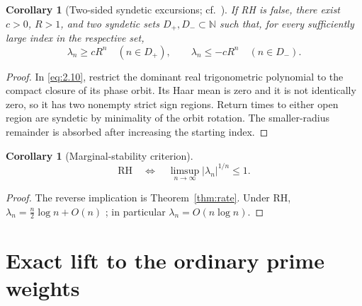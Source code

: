 \documentclass[11pt]{amsart}
\numberwithin{equation}{section}
\newtheorem{corollary}[theorem]{Corollary}
\theoremstyle{definition}
\theoremstyle{remark}
\newcommand{\RH}{\mathrm{RH}}
\begin{document}
\begin{corollary}[Two-sided syndetic excursions; cf.\ \cite{BombieriLagarias}]
\label{cor:two-sided}
If RH is false, there exist \(c>0\), \(R>1\), and two syndetic sets
\(D_+,D_-\subset\mathbb N\) such that, for every sufficiently large index
in the respective set,
\begin{equation}
 \lambda_n\ge cR^n\quad(n\in D_+),\qquad
 \lambda_n\le-cR^n\quad(n\in D_-).                       \label{eq:2.12a}
\end{equation}
\end{corollary}

\begin{proof}
In \eqref{eq:2.10}, restrict the dominant real trigonometric polynomial to the
compact closure of its phase orbit. Its Haar mean is zero and it is not
identically zero, so it has two nonempty strict sign regions. Return times
to either open region are syndetic by minimality of the orbit rotation.
The smaller-radius remainder is absorbed after increasing the starting
index.
\end{proof}

\begin{corollary}[Marginal-stability criterion]
\label{cor:raw-stability}
\begin{equation}
 \RH\quad\Longleftrightarrow\quad
 \limsup_{n\to\infty}|\lambda_n|^{1/n}\le1.              \label{eq:2.12}
\end{equation}
\end{corollary}

\begin{proof}
The reverse implication is Theorem~\ref{thm:rate}. Under RH,
\(\lambda_n=\frac n2\log n+O(n)\) \cite[Thm.~6.1]{Lagarias}; in
particular \(\lambda_n=O(n\log n)\).
\end{proof}

\section{Exact lift to the ordinary prime weights}
\label{sec:arithmetic}
\end{document}
